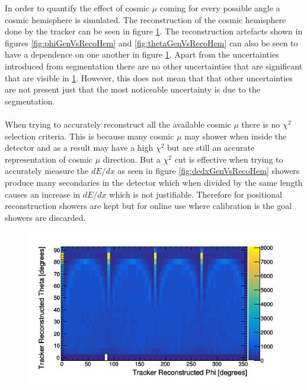 In order to quantify the effect of cosmic $\mu$ coming for every possible angle a cosmic hemisphere is simulated. The reconstruction of the cosmic hemisphere done by the tracker can be seen in figure \ref{fig:simulatedHemisphereDist}. The reconstruction artefacts shown in figures \ref{fig:phiGenVsRecoHem} and \ref{fig:thetaGenVsRecoHem} can also be seen to have a dependence on one another in figure \ref{fig:simulatedHemisphereDist}. Apart from the uncertainties introduced from segmentation there are no other uncertainties that are significant that are visible in \ref{fig:simulatedHemisphereDist}. However, this does not mean that that other uncertainties are not present just that the most noticeable uncertainty is due to the segmentation. 
\\\\ When trying to accurately reconstruct all the available cosmic $\mu$ there is no $\chi^2$ selection criteria. This is because many cosmic $\mu$ may shower when inside the detector and as a result may have a high $\chi^2$ but are still an accurate representation of cosmic $\mu$ direction. But a $\chi^2$ cut is effective when trying to accurately measure the $dE/dx$ as seen in figure \ref{fig:dedxGenVsRecoHem} showers produce many secondaries in the detector which when divided by the same length causes an increase in $dE/dx$ which is not justifiable. Therefore for positional reconstruction showers are kept but for online use where calibration is the goal showers are discarded.

\begin{figure}[H]
 \centering
 \includegraphics[width=0.8\linewidth]{Chapter5/Figs/Raster/pvsTFiduicalHemisphere.png}
 \label{fig:simulatedHemisphereDist}
\end{figure}

